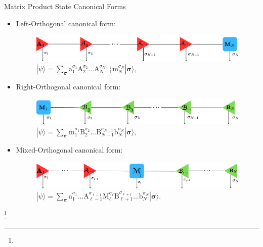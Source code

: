\documentclass{beamer}
\newcommand{\romanL}[1]{\boldsymbol{\mathrm{#1}}}
\begin{document}
\begin{frame}{Matrix Product State Canonical Forms}
    \small
    \begin{itemize}[<+->]
        \item Left-Orthogonal canonical form: 
            \begin{figure}
                \centering
                \includegraphics[width=0.8\linewidth]{images/MPS Orthogonality/L_canonical_short.png}
                \caption*{$|\psi\rangle = \sum_{\boldsymbol{\sigma}}\romanL{a}_1^{\sigma_1}\romanL{A}_2^{\sigma_2}...\romanL{A}_{N - 1}^{\sigma_{N - 1}}\romanL{m}_N^{\sigma_N}|\boldsymbol{\sigma}\rangle, \quad$}
                \label{fig:enter-label}
            \end{figure}
        \vspace{-15pt}
        \item Right-Orthogonal canonical form:
        \begin{figure}
            \centering
            \includegraphics[width=0.8\linewidth]{images/MPS Orthogonality/Right_canonical.png}
            \caption*{$|\psi\rangle = \sum_{\boldsymbol{\sigma}}\romanL{m}_1^{\sigma_1}\romanL{B}_2^{\sigma_2}...\romanL{B}_{N - 1}^{\sigma_{N - 1}}\romanL{b}_N^{\sigma_N}|\boldsymbol{\sigma}\rangle,\quad$}
            \label{fig:enter-label}
        \end{figure}
        \vspace{-15pt}
        \item Mixed-Orthogonal canonical form:
        
        \begin{figure}
            \centering
            \includegraphics[width=0.8\linewidth]{images/MPS Orthogonality/M_canonical_short.png}
            \caption*{$|\psi\rangle = \sum_{\boldsymbol{\sigma}}\romanL{a}_1^{\sigma_1}...\romanL{A}_{\ell - 1}^{\sigma_{\ell - 1}}\romanL{M}_\ell^{\sigma_\ell}\romanL{B}_{\ell + 1}^{\sigma_{\ell + 1}}...\romanL{b}_N^{\sigma_N}|\boldsymbol{\sigma}\rangle.$}
            \label{fig:mixed_canonical}
        \end{figure}
    \end{itemize}
    \footnote{}
\end{frame}
\end{document}
